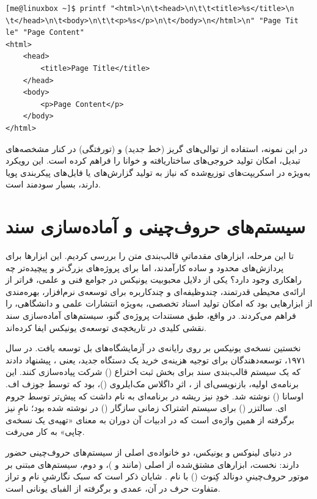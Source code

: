 \begin{latin}
\begin{lstlisting}
[me@linuxbox ~]$ printf "<html>\n\t<head>\n\t\t<title>%s</title>\n
\t</head>\n\t<body>\n\t\t<p>%s</p>\n\t</body>\n</html>\n" "Page Tit
le" "Page Content"
<html>
	<head>
		<title>Page Title</title>
	</head>
	<body>
		<p>Page Content</p>
	</body>
</html>
\end{lstlisting}
\end{latin}

در این نمونه، استفاده از توالی‌های گریز  (خط جدید) و  (تورفتگی) در کنار مشخصه‌های تبدیل، امکان تولید خروجی‌های ساختاریافته و خوانا را فراهم کرده است. این رویکرد به‌ویژه در اسکریپت‌های توزیع‌شده که نیاز به تولید گزارش‌های  یا فایل‌های پیکربندی پویا دارند، بسیار سودمند است.

\section{سیستم‌های حروف‌چینی و آماده‌سازی سند}

تا این مرحله، ابزارهای مقدماتیِ قالب‌بندی متن را بررسی کردیم. این ابزارها برای پردازش‌های محدود و ساده کارآمدند، اما برای پروژه‌های بزرگ‌تر و پیچیده‌تر چه راهکاری وجود دارد؟ یکی از دلایل محبوبیت یونیکس در جوامع فنی و علمی، فراتر از ارائه‌ی محیطی قدرتمند، چندوظیفه‌ای و چندکاربره برای توسعه‌ی نرم‌افزار، بهره‌مندی از ابزارهایی بود که امکان تولید اسناد تخصصی، به‌ویژه انتشارات علمی و دانشگاهی، را فراهم می‌کردند. در واقع، طبق مستندات پروژه‌ی گنو، سیستم‌های آماده‌سازی سند نقشی کلیدی در تاریخچه‌ی توسعه‌ی یونیکس ایفا کرده‌اند.

نخستین نسخه‌ی یونیکس بر روی رایانه‌ی  در آزمایشگاه‌های بل توسعه یافت. در سال ۱۹۷۱، توسعه‌دهندگان برای توجیه هزینه‌ی خرید یک دستگاه جدید، یعنی ، پیشنهاد دادند که یک سیستم قالب‌بندی سند برای بخش ثبت اختراع () شرکت  پیاده‌سازی کنند. این برنامه‌ی اولیه، بازنویسی‌ای از ، اثرِ داگلاس مک‌ایلروی ()، بود که توسط جوزف اف. اوسانا () نوشته شد. خودِ  نیز ریشه در برنامه‌ای به نام  داشت که پیش‌تر توسط جروم ای. سالتزر () برای سیستم اشتراک زمانی سازگار () در  نوشته شده بود؛ نامِ  نیز برگرفته از همین واژه‌ی  است که در ادبیات آن دوران به معنای «تهیه‌ی یک نسخه‌ی چاپی» به کار می‌رفت.

در دنیای لینوکس و یونیکس، دو خانواده‌ی اصلی از سیستم‌های حروف‌چینی حضور دارند: نخست، ابزارهای مشتق‌شده از  اصلی (مانند  و )، و دوم، سیستم‌های مبتنی بر موتور حروف‌چینیِ دونالد کِنوث () با نام . شایان ذکر است که سبک نگارشیِ نام  و تراز متفاوت حرف  در آن، عمدی و برگرفته از الفبای یونانی است.

